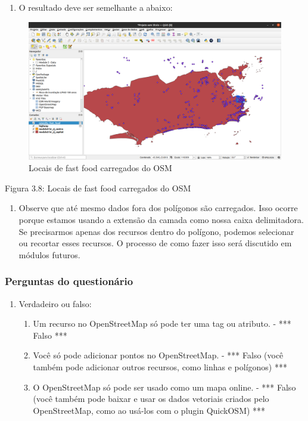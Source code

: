 \documentclass[
  portuguese,
]{krantz}
\providecommand{\tightlist}{%
  \setlength{\itemsep}{0pt}\setlength{\parskip}{0pt}}
\begin{document}
\begin{enumerate}
\def\labelenumi{\arabic{enumi}.}
\setcounter{enumi}{8}
\tightlist
\item
  O resultado deve ser semelhante a abaixo:
\end{enumerate}

\begin{figure}
\centering
\includegraphics{media/modulo3/quickosm-7.png}
\caption{Locais de fast food carregados do OSM}
\end{figure}

Figura 3.8: Locais de fast food carregados do OSM

\begin{enumerate}
\def\labelenumi{\arabic{enumi}.}
\setcounter{enumi}{9}
\tightlist
\item
  Observe que até mesmo dados fora dos polígonos são carregados. Isso ocorre porque estamos usando a extensão da camada como nossa caixa delimitadora. Se precisarmos apenas dos recursos dentro do polígono, podemos selecionar ou recortar esses recursos. O processo de como fazer isso será discutido em módulos futuros.
\end{enumerate}

\hypertarget{perguntas-do-questionuxe1rio-7}{%
\subsubsection{\texorpdfstring{\textbf{Perguntas do questionário}}{Perguntas do questionário}}\label{perguntas-do-questionuxe1rio-7}}

\begin{enumerate}
\def\labelenumi{\arabic{enumi}.}
\item
  Verdadeiro ou falso:

  \begin{enumerate}
  \def\labelenumii{\arabic{enumii}.}
  \tightlist
  \item
    Um recurso no OpenStreetMap só pode ter uma tag ou atributo. - *** Falso ***
  \item
    Você só pode adicionar pontos no OpenStreetMap. - *** Falso (você também pode adicionar outros recursos, como linhas e polígonos) ***
  \item
    O OpenStreetMap só pode ser usado como um mapa online. - *** Falso (você também pode baixar e usar os dados vetoriais criados pelo OpenStreetMap, como ao usá-los com o plugin QuickOSM) ***
  \end{enumerate}
\end{enumerate}
\end{document}
